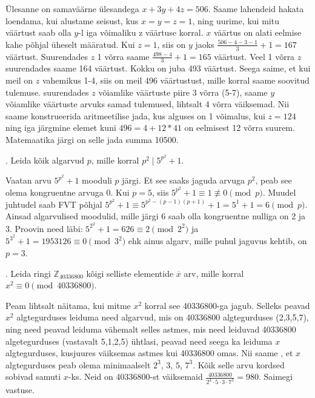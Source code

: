 \documentclass[a4paper, 10pt]{article}
\newcommand{\Z}{\mathbb{Z}}
\begin{document}
\bigskip
Ülesanne on samaväärne ülesandega $x+3y+4z=506$. Saame lahendeid hakata loendama, kui alustame seisust, kus $x=y=z=1$, ning uurime, kui mitu väärtust saab olla $y$-l iga võimaliku z väärtuse korral. $x$ väärtus on alati eelmise kahe põhjal üheselt määratud. Kui $z=1$, siis on $y$ jaoks $\frac{506-4-3-1}{3}+1=167$ väärtust. Suurendades $z$ 1 võrra saame $\frac{498-4}{3}+1=165$ väärtust. Veel 1 võrra $z$ suurendades saame 164 väärtust. Kokku on juba 493 väärtust. Seega saime, et kui meil on $z$ vahemikus 1-4, siis on meil 496 väärtustust, mille korral saame soovitud tulemuse. suurendades $z$ võiamlike väärtuste piire 3 võrra (5-7), saame $y$ võiamlike väärtuste arvuks samad tulemused, lihtsalt 4 võrra väiksemad. Nii saame konstrueerida aritmeetilise jada, kus alguses on 1 võimalus, kui $z=124$ ning iga järgmine elemet kuni $496=4+12*41$ on eelmisest 12 võrra suurem. Matemaatika järgi on selle jada summa 10500.

\bigskip

. Leida kõik algarvud $p$, mille korral $p^2\mid 5^{p^2}+1$.

\bigskip
Vaatan arvu $5^{p^2}+1$ mooduli $p$ järgi. Et see saaks jaguda arvuga $p^2$, peab see olema kongruentne arvuga 0. Kui $p=5$, siis $5^{p^2}+1\equiv1\not\equiv0\pmod p$. Muudel juhtudel saab FVT põhjal \mbox{$5^{p^2}+1\equiv5^{p^2-(p-1)(p+1)}+1=5^1+1=6\pmod p$}. Ainsad algarvulised moodulid, mille järgi 6 saab olla kongruentne nulliga on 2 ja 3. Proovin need läbi: $5^{2^2}+1=626\equiv2\pmod{2^2}$ ja $5^{3^2}+1=1953126\equiv0\pmod{3^2}$ ehk ainus algarv, mille puhul jaguvus kehtib, on $p=3$.
\bigskip

\pagebreak

. Leida ringi $\Z_{40336800}$ kõigi selliste elementide $\overline{x}$ arv, mille korral $x^2\equiv 0\pmod{40336800}$. 

\bigskip
Peam lihtsalt näitama, kui mitme $x^2$ korral see 40336800-ga jagub. Selleks peavad $x^2$ algtegurduses leiduma need algarvud, mis on 40336800 algtegurduses (2,3,5,7), ning need peavad leiduma vähemalt selles astmes, mis need leiduvad 40336800 algetegurduses (vastavalt 5,1,2,5) ühtlasi, peavad need seega ka leiduma $x$ algtegurduses, kusjuures väiksemas astmes kui 40336800 omas. Nii saame , et $x$ algtegurduses peab olema minimaalselt $2^3$, $3$, $5$, $7^3$. Kõik selle arvu kordsed sobivad samuti $x$-ks. Neid on 40336800-st väiksemaid $\frac{40336800}{2^3\cdot5\cdot3\cdot7^3}=980$. Saimegi vastuse. 

\bigskip
\end{document}
